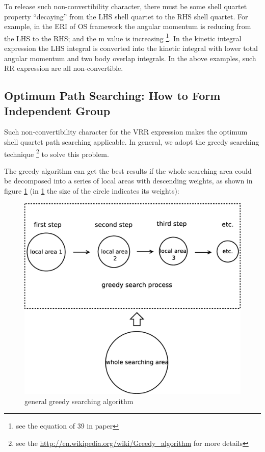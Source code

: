 To release such non-convertibility character, there must be some 
shell quartet property ``decaying'' from the LHS shell quartet
to the RHS shell quartet. For example, in the ERI of OS framework
the angular momentum is reducing from the LHS to the RHS; and the 
m value is increasing \footnote{see the equation of 39 in \cite{OS1986}
paper}. In the kinetic integral expression the LHS integral
is converted into the kinetic integral with lower total angular momentum
and two body overlap integrals. In the above examples, such RR 
expression are all non-convertible.

\subsection{Optimum Path Searching: How to Form Independent Group}
%
%
\label{vrr_sq_search}

Such non-convertibility character for the VRR expression makes 
the optimum shell quartet path searching applicable. In general,
we adopt the greedy searching technique \footnote{see the 
\url{http://en.wikipedia.org/wiki/Greedy_algorithm} for more 
details} to solve this problem. 

The greedy algorithm can get the best results if the whole searching
area could be decomposed into a series of local areas with descending 
weights, as shown in figure \ref{fig:3} (in \ref{fig:3} the size 
of the circle indicates its weights):

 \begin{figure}[htb]
 \centering
 \includegraphics[scale=0.4]{./greedy.eps}
 \caption{general greedy searching algorithm}
 \label{fig:3}
\end{figure}

